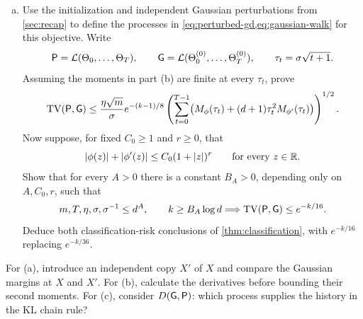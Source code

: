 \begin{exercisechunk}
\begin{enumerate}[(a),beginpenalty=10000]
\item Use the initialization and independent Gaussian perturbations from
\cref{sec:recap} to define the processes in
\cref{eq:perturbed-gd,eq:gaussian-walk} for this objective. Write
\[
\mathsf P=\mathcal L(\Theta_0,\ldots,\Theta_T),
\qquad
\mathsf G=\mathcal L(\Theta_0^{(0)},\ldots,\Theta_T^{(0)}),
\qquad \tau_t=\sigma\sqrt{t+1}.
\]
Assuming the moments in part (b) are finite at every $\tau_t$, prove
\[
\mathrm{TV}(\mathsf P,\mathsf G)
\le\frac{\eta\sqrt m}{\sigma}e^{-(k-1)/8}
\left(\sum_{t=0}^{T-1}
\bigl(M_\phi(\tau_t)+(d+1)\tau_t^2M_{\phi'}(\tau_t)\bigr)
\right)^{1/2}.
\]
Now suppose, for fixed $C_0\ge1$ and $r\ge0$, that
\[
|\phi(z)|+|\phi'(z)|\le C_0(1+|z|)^r
\qquad\text{for every }z\in\mathbb R.
\]
Show that for every $A>0$ there is a constant $B_A>0$, depending only on
$A,C_0,r$, such that
\[
m,T,\eta,\sigma,\sigma^{-1}\le d^A,
\qquad k\ge B_A\log d
\relax\Longrightarrow\relax
\mathrm{TV}(\mathsf P,\mathsf G)\le e^{-k/16}.
\]
Deduce both classification-risk conclusions of
\cref{thm:classification}, with $e^{-k/16}$ replacing $e^{-k/36}$.
\end{enumerate}

\begin{hints}
For (a), introduce an independent copy $X'$ of $X$ and compare the Gaussian
margins at $X$ and $X'$. For (b), calculate the derivatives before bounding
their second moments. For (c), consider $D(\mathsf G,\mathsf P)$:
which process supplies the history in the KL chain rule?
\end{hints}
\end{exercisechunk}
